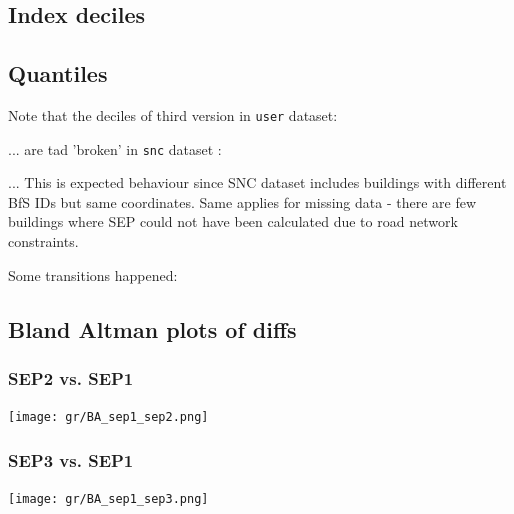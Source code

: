 \documentclass[a4paper, notitlepage, fleqn]{article} %
\begin{document}
\subsection{Index deciles}
\begin{stlog}\end{stlog}
\subsection{Quantiles}

Note that the deciles of third version in \texttt{user} dataset:
\begin{stlog}\end{stlog}
... are tad 'broken' in \texttt{snc} dataset :
\begin{stlog}\end{stlog}
... This is expected behaviour since SNC dataset includes buildings with different BfS IDs but same coordinates. 
Same applies for missing data - there are few buildings where SEP could not have been calculated due to road network constraints.  
\begin{landscape}
Some transitions happened:  
\begin{stlog}\end{stlog}
\end{landscape}

\subsection{Bland Altman plots of diffs}
\subsubsection{SEP2 vs. SEP1}

\begin{center}
\texttt{[image: gr/BA\_sep1\_sep2.png]} 
\end{center}

\subsubsection{SEP3 vs. SEP1}

\begin{center}
\texttt{[image: gr/BA\_sep1\_sep3.png]} 
\end{center}
\newpage
\end{document}
